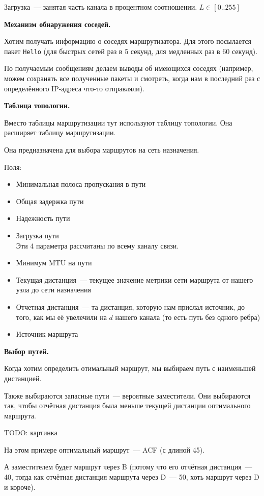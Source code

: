 Загрузка~--- занятая часть канала в процентном соотношении. $L\in[0..255]$

{\bf Механизм обнаружения соседей.}

Хотим получать информацию о соседях маршрутизатора. Для этого посылается пакет {\tt Hello} (для быстрых сетей раз в 5 секунд, для медленных раз в 60 секунд).

По получаемым сообщениям делаем выводы об имеющихся соседях (например, можем сохранять все полученные пакеты и смотреть, когда нам в последний раз с определённого IP-адреса что-то отправляли).

{\bf Таблица топологии.}

Вместо таблицы маршрутизации тут используют таблицу топологии. Она расширяет таблицу маршрутизации.

Она предназначена для выбора маршрутов на сеть назначения.

Поля:
\begin{itemize}
    \item Минимальная полоса пропускания в пути
    \item Общая задержка пути
    \item Надежность пути
    \item Загрузка пути\\
    Эти 4 параметра рассчитаны по всему каналу связи.
    \item Минимум MTU на пути
    \item Текущая дистанция~--- текущее значение метрики сети маршрута от нашего узла до сети назначения
    \item Отчетная дистанция~--- та дистанция, которую нам прислал источник, до того, как мы её увелечили на $d$ нашего канала (то есть путь без одного ребра)
    \item Источник маршрута
\end{itemize}

{\bf Выбор путей.}

Когда хотим определить отимальный маршрут, мы выбираем путь с наименьшей дистанцией.

Также выбираются запасные пути~--- вероятные заместители. Они выбираются так, чтобы отчётная дистанция была меньше текущей дистанции оптимального маршрута.

TODO: картинка

На этом примере оптимальный маршрут~--- ACF (с длиной 45).

А заместителем будет маршрут через B (потому что его отчётная дистанция~--- 40, тогда как отчётная дистанция маршрута через D~--- 50, хоть маршрут через D и короче).

